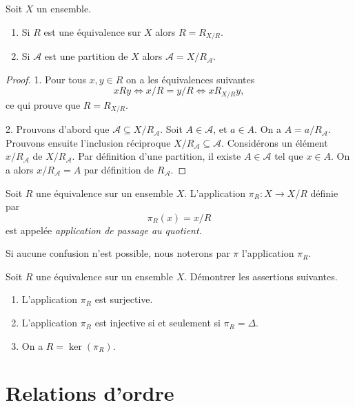 \documentclass[french,course,oneside,theoremnosection]{lecture}
\begin{document}
\begin{definition}
\begin{proposition}Soit $X$ un ensemble.
\begin{enumerate}
\item Si $R$ est une équivalence sur $X$ alors $R=R_{X{/}R}$.
\item Si $\mathcal{A}$ est une partition de $X$ alors $\mathcal{A}=X{/}R_{\mathcal{A}}$.
\end{enumerate}
\end{proposition}
\begin{proof}
1. Pour tous $x,y \in R$ on a les équivalences suivantes
\[
xRy \iff x{/}R=y{/}R \iff xR_{X{/}R}y,
\]
ce qui prouve que $R=R_{X{/}R}$.

2. Prouvons d'abord que $\mathcal{A} \subseteq X{/}R_{\mathcal{A}}.$ Soit $A\in \mathcal{A}$, et $a\in A$. On a $A=a{/}R_{\mathcal{A}}$. Prouvons ensuite l'inclusion réciproque $X{/}R_{\mathcal{A}}\subseteq \mathcal{A}$. Considérons  un élément $x{/}R_{\mathcal{A}}$ de $X/R_{\mathcal{A}}$. Par définition d'une partition, il existe $A\in \mathcal{A}$ tel que $x\in A$. On a alors $x{/}R_{\mathcal{A}}=A$ par définition de $R_{\mathcal{A}}$.
\end{proof}


\begin{definition}
Soit $R$ une équivalence sur un ensemble $X$. L'application $\pi_R\colon X  \to X{/}R$ définie par
\[
\pi_R(x)=x{/}R
\]
est appelée \emph{application de passage au quotient}.
\end{definition}

\begin{notation}
Si aucune confusion n'est possible, nous noterons par $\pi$ l'application $\pi_R$.
\end{notation}


\begin{exercise} Soit $R$ une équivalence sur un ensemble $X$. Démontrer les assertions suivantes.
\begin{enumerate}
\item L'application $\pi_R$ est surjective.
\item L'application $\pi_R$ est injective si et seulement si $\pi_R=\Delta$.
\item On a $R=\ker(\pi_R)$.
\end{enumerate}
\end{exercise}
\end{definition}


\section{Relations d'ordre}
\end{document}
